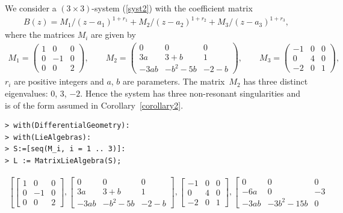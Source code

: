 \documentclass[pdftex]{sigma}
\numberwithin{equation}{section}
\begin{document}
\begin{Example} We consider a $(3\times3)$-system (\ref{syst2}) with the coefficient matrix
\begin{gather*}
B(z)= M_1/(z-a_1)^{1+r_1}+M_2/(z-a_2)^{1+r_2}+M_3/(z-a_3)^{1+r_3},
\end{gather*}
where the matrices $M_i$ are given by
\begin{gather*}
M_1=\left( \begin{matrix} 1&0&0\\ 0&-1&0
\\ 0&0&2\end{matrix} \right),
\qquad M_2 = \left( \begin{matrix} 0&0&0\\ 3 a&3+b&1
\\ -3 ab&-{b}^{2}-5 b&-2-b\end{matrix} \right),
\qquad M_3 = \left( \begin{matrix} -1&0&0\\ 0&4&0
\\ -2&0&1\end{matrix} \right),
\end{gather*}
$r_i$ are positive integers and $a$, $b$ are parameters. The matrix~$M_2$ has three distinct eigenvalues: $0$, $3$, $-2$.
Hence the system has three non-resonant singularities and is of the form assumed in Corollary~\ref{corollary2}.
\begin{verbatim}
> with(DifferentialGeometry):
> with(LieAlgebras):
> S:=[seq(M_i, i = 1 .. 3)]:
> L := MatrixLieAlgebra(S);
\end{verbatim}
\begin{gather*} \left[ \left[ \begin{matrix} 1&0&0\\ 0&-1&0
		\\ 0&0&2\end{matrix} \right] , \left[ \begin{matrix} 0&0&0\\ 3 a&3+b&1\\ -3 ab&
		-{b}^{2}-5 b&-2-b\end{matrix} \right] , \left[ \begin{matrix} -1
		&0&0\\ 0&4&0\\ -2&0&1\end{matrix}
		\right] , \left[ \begin{matrix} 0&0&0\\ -6 a&0
		&-3\\ -3 ab&-3 {b}^{2}-15 b&0\end{matrix}

\end{gather*}
\end{Example}
\end{document}
